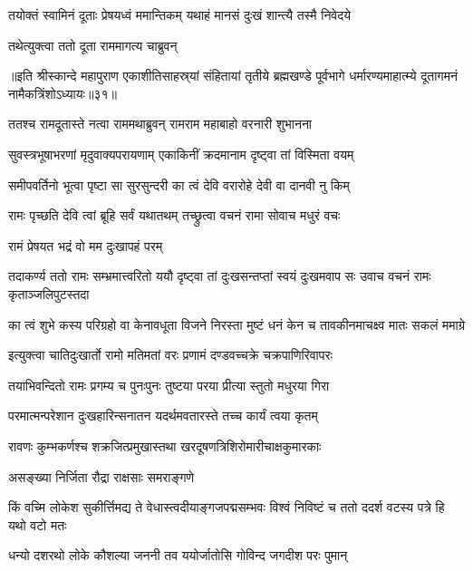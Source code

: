 \twolineshloka
{तयोक्तं स्वामिनं दूताः प्रेषयध्वं ममान्तिकम्}
{यथाहं मानसं दुःखं शान्त्यै तस्मै निवेदये}%

\onelineshloka
{तथेत्युक्त्वा ततो दूता राममागत्य चाब्रुवन्}%

॥इति श्रीस्कान्दे महापुराण एकाशीतिसाहस्र्यां संहितायां तृतीये ब्रह्मखण्डे पूर्वभागे धर्मारण्यमाहात्म्ये दूतागमनं नामैकत्रिंशोऽध्यायः॥३१॥

\resetShloka


\twolineshloka
{ततश्च रामदूतास्ते नत्वा राममथाब्रुवन्}
{रामराम महाबाहो वरनारी शुभानना}%

\twolineshloka
{सुवस्त्रभूषाभरणां मृदुवाक्यपरायणाम्}
{एकाकिनीं क्रदमानाम दृष्ट्वा तां विस्मिता वयम्}%

\twolineshloka
{समीपवर्तिनो भूत्वा पृष्टा सा सुरसुन्दरी}
{का त्वं देवि वरारोहे देवी वा दानवी नु किम्}%

\twolineshloka
{रामः पृच्छति देवि त्वां ब्रूहि सर्वं यथातथम्}
{तच्छ्रुत्वा वचनं रामा सोवाच मधुरं वचः}%

\onelineshloka
{रामं प्रेषयत भद्रं वो मम दुःखापहं परम्}%

\threelineshloka
{तदाकर्ण्य ततो रामः सम्भ्रमात्त्वरितो ययौ}
{दृष्ट्वा तां दुःखसन्तप्तां स्वयं दुःखमवाप सः}
{उवाच वचनं रामः कृताञ्जलिपुटस्तदा}%


\twolineshloka
{का त्वं शुभे कस्य परिग्रहो वा केनावधूता विजने निरस्ता}
{मुष्टं धनं केन च तावकीनमाचक्ष्व मातः सकलं ममाग्रे}%

\twolineshloka
{इत्युक्त्वा चातिदुःखार्तो रामो मतिमतां वरः}
{प्रणामं दण्डवच्चक्रे चक्रपाणिरिवापरः} %

\twolineshloka
{तयाभिवन्दितो रामः प्रगम्य च पुनःपुनः}
{तुष्टया परया प्रीत्या स्तुतो मधुरया गिरा}%

\twolineshloka
{परमात्मन्परेशान दुःखहारिन्सनातन}
{यदर्थमवतारस्ते तच्च कार्यं त्वया कृतम्}%

\twolineshloka
{रावणः कुम्भकर्णश्च शक्रजित्प्रमुखास्तथा}
{खरदूषणत्रिशिरोमारीचाक्षकुमारकाः}%

\onelineshloka
{असङ्ख्या निर्जिता रौद्रा राक्षसाः समराङ्गणे}%

\twolineshloka
{किं वच्मि लोकेश सुकीर्त्तिमद्य ते वेधास्त्वदीयाङ्गजपद्मसम्भवः}
{विश्वं निविष्टं च ततो ददर्श वटस्य पत्रे हि यथो वटो मतः}%

\twolineshloka
{धन्यो दशरथो लोके कौशल्या जननी तव}
{ययोर्जातोसि गोविन्द जगदीश परः पुमान्}%

